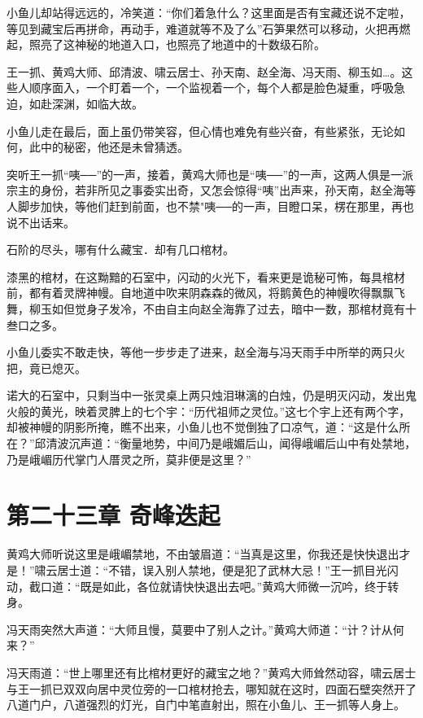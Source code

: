 \documentclass[12pt,oneside]{book}
\begin{document}
小鱼儿却站得远远的，冷笑道：``你们着急什么？这里面是否有宝藏还说不定啦，等见到藏宝后再拼命，再动手，难道就等不及了么''石笋果然可以移动，火把再燃起，照亮了这神秘的地道入口，也照亮了地道中的十数级石阶。

王一抓、黄鸡大师、邱清波、啸云居士、孙天南、赵全海、冯天雨、柳玉如\ldots。这些人顺序面入，一个盯着一个，一个监视着一个，每个人都是脸色凝重，呼吸急迫，如赴深渊，如临大故。

小鱼儿走在最后，面上虽仍带笑容，但心情也难免有些兴奋，有些紧张，无论如何，此中的秘密，他还是未曾猜透。

突听王一抓``咦──''的一声，接着，黄鸡大师也是``咦──''的一声，这两人俱是一派宗主的身份，若非所见之事委实出奇，又怎会惊得``咦''出声来，孙天南，赵全海等人脚步加快，等他们赶到前面，也不禁"咦──的一声，目瞪口呆，楞在那里，再也说不出话来。

石阶的尽头，哪有什么藏宝．却有几口棺材。

漆黑的棺材，在这黝黯的石室中，闪动的火光下，看来更是诡秘可怖，每具棺材前，都有着灵牌神幔。自地道中吹来阴森森的微风，将鹅黄色的神幔吹得飘飘飞舞，柳玉如但觉身子发冷，不由自主向赵全海靠了过去，暗中一数，那棺材竟有十叁口之多。

小鱼儿委实不敢走快，等他一步步走了进来，赵全海与冯天雨手中所举的两只火把，竟已熄灭。

诺大的石室中，只剩当中一张灵桌上两只烛泪琳漓的白烛，仍是明灭闪动，发出鬼火般的黄光，映着灵脾上的七个宇：``历代祖师之灵位。''这七个宇上还有两个字，却被神幔的阴影所掩，瞧不出来，小鱼儿也不觉倒独了口凉气，道：``这是什么所在？''邱清波沉声道：``衡量地势，中间乃是峨媚后山，闻得峨嵋后山中有处禁地，乃是峨嵋历代掌门人厝灵之所，莫非便是这里？''

\hypertarget{ux7b2cux4e8cux5341ux4e09ux7ae0-ux5947ux5cf0ux8fedux8d77}{%
\chapter{第二十三章
奇峰迭起}\label{ux7b2cux4e8cux5341ux4e09ux7ae0-ux5947ux5cf0ux8fedux8d77}}

黄鸡大师听说这里是峨嵋禁地，不由皱眉道：``当真是这里，你我还是快快退出才是！''啸云居士道：``不错，误入别人禁地，便是犯了武林大忌！''王一抓目光闪动，截口道：``既是如此，各位就请快快退出去吧。''黄鸡大师微一沉吟，终于转身。

冯天雨突然大声道：``大师且慢，莫要中了别人之计。''黄鸡大师道：``计？计从何来？''

冯天雨道：``世上哪里还有比棺材更好的藏宝之地？''黄鸡大师耸然动容，啸云居士与王一抓已双双向居中灵位旁的一口棺材抢去，哪知就在这时，四面石壁突然开了八道门户，八道强烈的灯光，自门中笔直射出，照在小鱼儿、王一抓等人身上。
\end{document}
